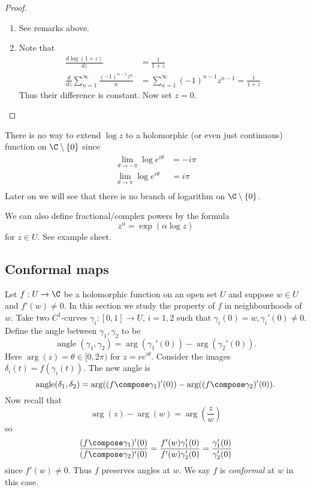 \documentclass[a4paper]{article}
\begin{document}
\begin{proof}\leavevmode
  \begin{enumerate}
  \item See remarks above.
  \item Note that
    \begin{align*}
      \frac{d \log(1 + z)}{dz}
      &= \frac{1}{1 + z} \\
      \frac{d}{dz} \sum_{n = 1}^\infty \frac{(-1)^{n - 1}z^n}{n}
      &= \sum_{n = 1}^\infty (-1)^{n - 1}z^{n -1}
        = \frac{1}{1 + z}
    \end{align*}
    Thus their difference is constant. Now set \(z = 0\).
  \end{enumerate}
\end{proof}

\begin{remark}
  There is no way to extend \(\log z\) to a holomorphic (or even just continuous) function on \(\C \setminus \{0\}\) since
  \begin{align*}
    \lim_{\theta \to -\pi} \log e^{i\theta} &= -i\pi \\
    \lim_{\theta \to \pi} \log e^{i\theta} &= i\pi \\
  \end{align*}
  Later on we will see that there is no branch of logarithm on \(\C \setminus \{0\}\).
\end{remark}

We can also define fractional/complex powers by the formula
\[
  z^\alpha = \exp (\alpha \log z)
\]
for \(z \in U\). See example sheet.

\subsection{Conformal maps}

Let \(f: U \to \C\) be a holomorphic function on an open set \(U\) and suppose \(w \in U\) and \(f'(w) \neq 0\). In this section we study the property of \(f\) in neighbourhoods of \(w\). Take two \(C^1\)-curves \(\gamma_i: [0, 1] \to U\), \(i = 1, 2\) such that \(\gamma_i(0) = w, \gamma_i'(0) \neq 0\). Define the angle between \(\gamma_1, \gamma_2\) to be
\[
  \operatorname{angle}(\gamma_1, \gamma_2) = \arg(\gamma_1'(0)) - \arg(\gamma_2'(0)).
\]
Here \(\arg(z) = \theta \in [0, 2\pi)\) for \(z = re^{i\theta}\). Consider the images \(\delta_i(t) = f(\gamma_i(t))\). The new angle is
\[
  \operatorname{angle}(\delta_1, \delta_2) = \arg((f \compose \gamma_1)'(0)) - \arg((f \compose \gamma_2)'(0)).
\]
Now recall that
\[
  \arg(z) - \arg(w) = \arg(\frac{z}{w})
\]
so
\[
  \frac{(f \compose \gamma_1)'(0)}{(f \compose \gamma_2)'(0)}
  = \frac{f'(w)\gamma_1'(0)}{f'(w)\gamma_2'(0)}
  = \frac{\gamma_1'(0)}{\gamma_2'(0)}
\]
since \(f'(w) \neq 0\). Thus \(f\) preserves angles at \(w\). We say \(f\) is \emph{conformal} at \(w\) in this case.
\end{document}
